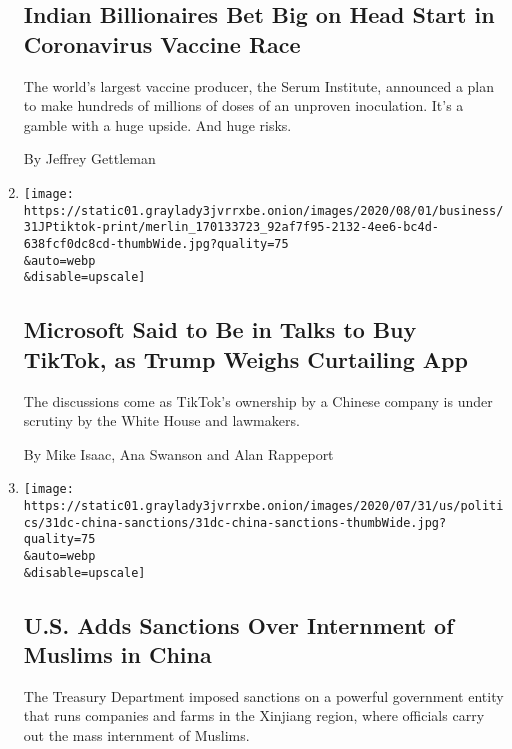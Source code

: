 \begin{enumerate}
{  \subsection{Indian Billionaires Bet Big on Head Start in Coronavirus
  Vaccine
  Race}\label{indian-billionaires-bet-big-on-head-start-in-coronavirus-vaccine-race}}

  The world's largest vaccine producer, the Serum Institute, announced a
  plan to make hundreds of millions of doses of an unproven inoculation.
  It's a gamble with a huge upside. And huge risks.

  By Jeffrey Gettleman
\item
  \href{/2020/07/31/technology/tiktok-microsoft.html}{}

  \texttt{[image: https://static01.graylady3jvrrxbe.onion/images/2020/08/01/business/31JPtiktok-print/merlin\_170133723\_92af7f95-2132-4ee6-bc4d-638fcf0dc8cd-thumbWide.jpg?quality=75\\\&auto=webp\\\&disable=upscale]}

  \hypertarget{microsoft-said-to-be-in-talks-to-buy-tiktok-as-trump-weighs-curtailing-app}{%
  \subsection{Microsoft Said to Be in Talks to Buy TikTok, as Trump
  Weighs Curtailing
  App}\label{microsoft-said-to-be-in-talks-to-buy-tiktok-as-trump-weighs-curtailing-app}}

  The discussions come as TikTok's ownership by a Chinese company is
  under scrutiny by the White House and lawmakers.

  By Mike Isaac, Ana Swanson and Alan Rappeport
\item
  \href{/2020/07/31/us/politics/sanctions-china-xinjiang-uighurs.html}{}

  \texttt{[image: https://static01.graylady3jvrrxbe.onion/images/2020/07/31/us/politics/31dc-china-sanctions/31dc-china-sanctions-thumbWide.jpg?quality=75\\\&auto=webp\\\&disable=upscale]}

  \hypertarget{us-adds-sanctions-over-internment-of-muslims-in-china}{%
  \subsection{U.S. Adds Sanctions Over Internment of Muslims in
  China}\label{us-adds-sanctions-over-internment-of-muslims-in-china}}

  The Treasury Department imposed sanctions on a powerful government
  entity that runs companies and farms in the Xinjiang region, where
  officials carry out the mass internment of Muslims.


\end{enumerate}
